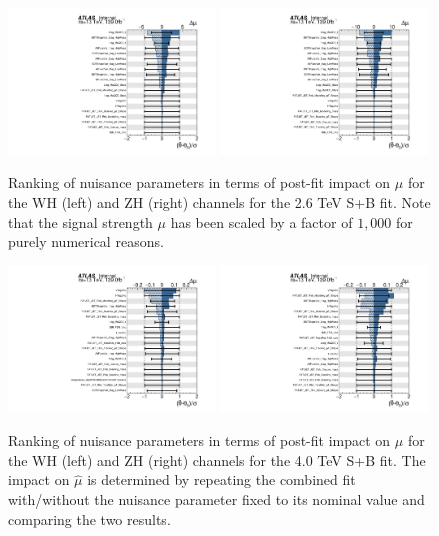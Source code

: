 \begin{figure}[htbp!]
    \begin{center}
        \includegraphics[width=0.49\textwidth]{Ranking_WH_2600.pdf}
        \includegraphics[width=0.49\textwidth]{Ranking_ZH_2600.pdf}
    \end{center}
    \caption{Ranking of nuisance parameters in terms of post-fit impact on $\hat{\mu}$ for the WH (left) and ZH (right) channels for the 2.6 TeV S+B fit.
        Note that the signal strength $\mu$ has been scaled by a factor of $1,000$ for purely numerical reasons.
    }
    \label{fig:rank_plots_2p6TeV}
\end{figure}

\begin{figure}[htbp!]
    \begin{center}
        \includegraphics[width=0.49\textwidth]{Ranking_WH_4000.pdf}
        \includegraphics[width=0.49\textwidth]{Ranking_ZH_4000.pdf}
    \end{center}
    \caption{Ranking of nuisance parameters in terms of post-fit impact on $\hat{\mu}$ for the WH (left) and ZH (right) channels for the 4.0 TeV S+B fit.
    The impact on $\hat{\mu}$ is determined by repeating the combined fit with/without the nuisance parameter fixed to its nominal value and comparing the two results.
    }
    \label{fig:rank_plots_4TeV}
\end{figure}

